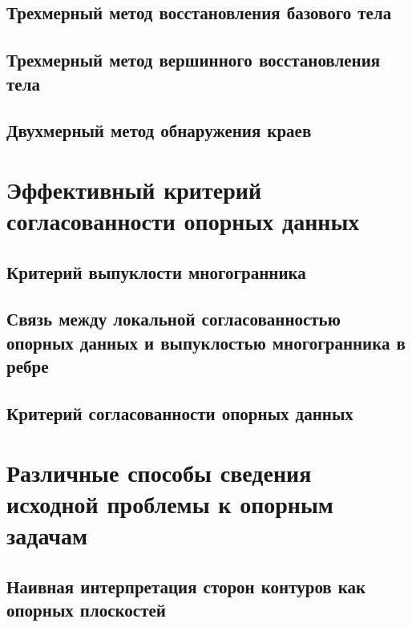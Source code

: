 \documentclass[a4paper, 12pt, titlepage]{article}
\theoremstyle{definition}
\theoremstyle{plain}
\theoremstyle{plain}
\begin{document}
\subsection{Трехмерный метод восстановления базового тела}

\subsection{Трехмерный метод вершинного восстановления тела}

\subsection{Двухмерный метод обнаружения краев}


\section{Эффективный критерий согласованности опорных данных}

\subsection{Критерий выпуклости многогранника}

\subsection{Связь между локальной согласованностью опорных данных и выпуклостью
многогранника в ребре}

\subsection{Критерий согласованности опорных данных}


\section{Различные способы сведения исходной проблемы к опорным задачам}

\subsection{Наивная интерпретация сторон контуров как опорных плоскостей}
\end{document}
